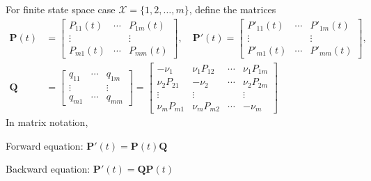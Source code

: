 \documentclass[letterpaper,handout, mathserif]{beamer}
\def\X{\mathcal{X}}
\begin{document}
\begin{frame}
For finite state space case $\X=\{1,2,\ldots,m\}$, define the matrices
\begin{align*}
\mathbf{P}(t)&=
\begin{bmatrix}
P_{11}(t)&\cdots&P_{1m}(t)\\
\vdots   &      &\vdots\\
P_{m1}(t)&\cdots&P_{mm}(t)
\end{bmatrix},\quad
\mathbf{P}'(t)=
\begin{bmatrix}
P'_{11}(t)&\cdots&P'_{1m}(t)\\
\vdots   &      &\vdots\\
P'_{m1}(t)&\cdots&P'_{mm}(t)
\end{bmatrix},\\
\mathbf{Q}&=
\begin{bmatrix}
q_{11}&\cdots&q_{1m}\\
\vdots&      &\vdots\\
q_{m1}&\cdots&q_{mm}
\end{bmatrix}
=
\begin{bmatrix}
-\nu_1& \nu_1 P_{12} &\cdots&\nu_1 P_{1m}\\
\nu_2 P_{21}& -\nu_2 &\cdots&\nu_2 P_{2m}\\
\vdots&\vdots&      &\vdots\\
\nu_mP_{m1}&\nu_mP_{m2}&\cdots&-\nu_m
\end{bmatrix}
\end{align*}
In matrix notation,

Forward equation: $\mathbf{P}'(t)=\mathbf{P}(t)\mathbf{Q}$

Backward equation: $\mathbf{P}'(t)=\mathbf{Q}\mathbf{P}(t)$
\end{frame}
\end{document}
